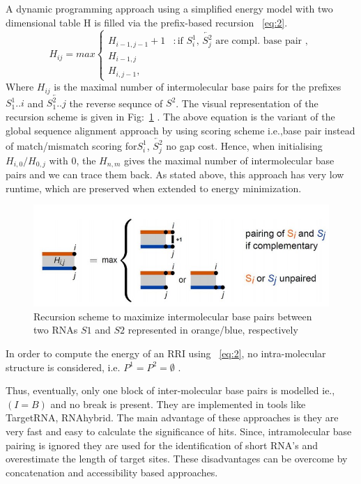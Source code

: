 \documentclass[twoside,a4paper]{report}
\begin{document}
	
	 A dynamic programming approach using a simplified energy model with two dimensional table H is filled via the prefix-based recursion ~\ref{eq:2}.\\
	 \begin{equation}
	 \label{eq:2}
	H_{ij} = max \begin{cases}
	H_{i-1,j-1}+1 & : \text{if $S^1_i$, $\overleftarrow{S^2_j}$ are compl. base pair }, \\
	H_{i-1,j} \\
	H_{i,j-1} ,
	\end{cases}
	\end{equation}
	Where $H_{ij}$ is the maximal number of intermolecular base pairs for the prefixes $S^1_1..i$	and $\overleftarrow{S^2_1..j}$ the reverse sequnce of $S^2$. The visual representation of the recursion scheme is given in Fig:~\ref{fig:hybrid} . The above equation is the variant of the global sequence alignment approach by \citet{needleman1970general} using scoring scheme i.e.,base pair instead of match/mismatch scoring for$S^1_i$, $\overleftarrow{S^2_j}$ no gap cost. Hence, when initialising $ H_{i,0} / H_{0,j} $ with 0, the $H_{n,m} $ gives the maximal number of intermolecular base pairs and we can trace them back. As stated above, this approach has very low runtime, which are preserved when extended to energy minimization.\\
	
	 \begin{figure}[tb]
		\includegraphics[width=0.8\linewidth]{hybrid}
		\centering
		\caption{Recursion scheme to maximize intermolecular base pairs between two RNAs $S1$ and $S2$ represented in orange/blue, respectively} 
		\label{fig:hybrid}
	\end{figure}

	In order to compute the energy of an RRI using ~\ref{eq:2}, no intra-molecular structure is considered, i.e. $P^1=P^2= \emptyset $ .
	
	Thus, eventually, only one block of inter-molecular base pairs is modelled ie., $(I = B)$ and no break is present. They are implemented in tools like TargetRNA, RNAhybrid. The main advantage of these approaches is they are very fast and easy to calculate the significance of hits.  Since,  intramolecular base pairing is ignored they are used for the identification of short RNA's and overestimate the length of target sites. These disadvantages can be overcome by concatenation and accessibility based approaches.\\ 
	
\end{document}
